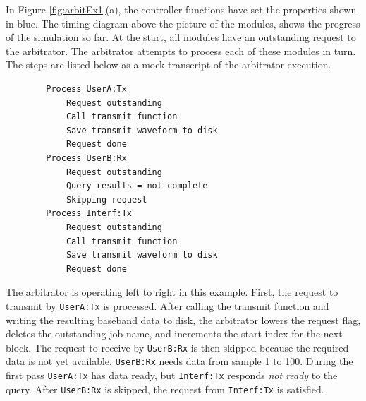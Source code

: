 In Figure \ref{fig:arbitEx1}(a), the controller functions have set
the properties shown in blue.  The timing diagram above the picture
of the modules, shows the progress of the simulation so far.  At the
start, all modules have an outstanding request to the arbitrator.
The arbitrator attempts to process each of these modules in turn.
The steps are listed below as a mock transcript of the arbitrator
execution.

\begin{verbatim}
        Process UserA:Tx
            Request outstanding
            Call transmit function
            Save transmit waveform to disk
            Request done
        Process UserB:Rx
            Request outstanding
            Query results = not complete
            Skipping request
        Process Interf:Tx
            Request outstanding
            Call transmit function
            Save transmit waveform to disk
            Request done
\end{verbatim}

The arbitrator is operating left to right in this example. First,
the request to transmit by \verb+UserA:Tx+ is processed. After
calling the transmit function and writing the resulting baseband
data to disk, the arbitrator lowers the request flag, deletes the
outstanding job name, and increments the start index for the next
block.  The request to receive by \verb+UserB:Rx+ is then skipped
because the required data is not yet available. \verb+UserB:Rx+
needs data from sample 1 to 100.  During the first pass
\verb+UserA:Tx+ has data ready, but \verb+Interf:Tx+ responds
\emph{not ready} to the query. After \verb+UserB:Rx+ is skipped, the
request from \verb+Interf:Tx+ is satisfied.

